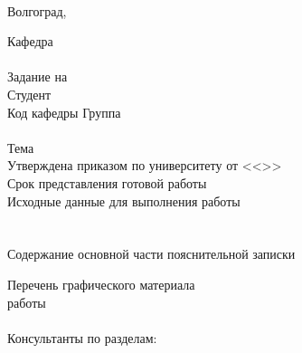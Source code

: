 {{\hfill
{}\\
\vspace{\fill}
\begin{center}
Волгоград,~\the\year
\end{center}
\newpage
{
\clearpage
\thispagestyle{empty}
\begin{center}
\VSTUTitleHeading
\end{center}
Кафедра~\uline{\VSTUDepartment\hfill}\\
\vfill
\hfill\VSTUTitleHeadApproval
\vspace{\fill}
\\Задание на \\
Студент \\
Код кафедры \uline{\makebox[4cm]{\VSTUDepartmentCode}} \hfill Группа \uline{\makebox[4cm]{\VSTUStudentGroup}}\\
\vspace{1mm}\\
Тема \VSTUTitleUL\\
Утверждена приказом по университету от <<\uline{\makebox[0.5cm]{\VSTUOrderDate}}>> \uline{\makebox[1.8cm]{\VSTUOrderMonth}} \uline{\makebox[1.2cm]{\VSTUOrderYear}} \No\uline{\makebox[1.5cm]{\VSTUOrderNumber}}\\
Срок представления готовой работы \\
Исходные данные для выполнения работы\\
\VSTUInitialDataUL\\
\vspace{4mm}\\
Содержание основной части пояснительной записки
{\small
\VSTUPZContents
}
\clearpage
\thispagestyle{empty}
\addtocounter{page}{-1}
\noindent Перечень графического материала\\
{\small
\VSTUPZGraphics
}
\vspace{\fill}
 работы 
\hfill
{}\\\\
Консультанты по разделам:\\
}}}
